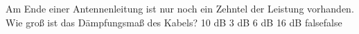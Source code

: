     {Am Ende einer Antennenleitung ist nur noch ein Zehntel der Leistung vorhanden. Wie groß ist das Dämpfungsmaß des Kabels?}
    {10 dB}
    {3 dB}
    {6 dB}
    {16 dB}
    {false}{false}